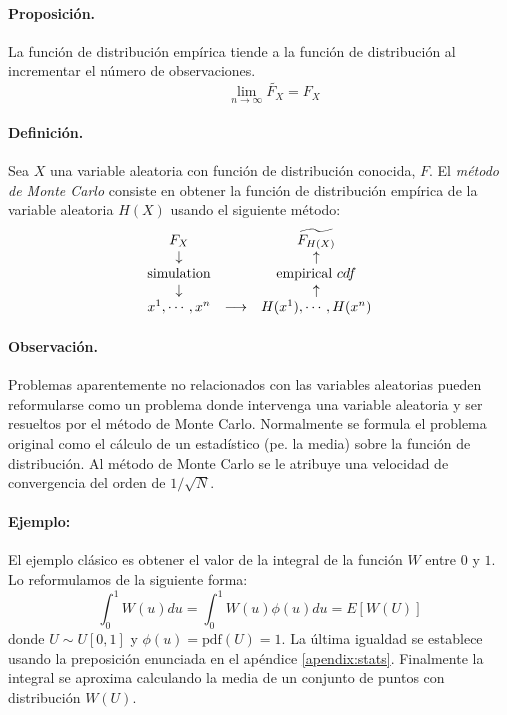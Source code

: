 \paragraph{Proposici\'on.} La funci\'on de distribuci\'on emp\'irica tiende a 
la funci\'on de distribuci\'on al incrementar el n\'umero de observaciones.
\begin{displaymath}
\qquad \lim_{n\to\infty} \widetilde{F_X} = F_X
\end{displaymath}

\paragraph{Definici\'on.} Sea $X$ una variable aleatoria con funci\'on de 
distribuci\'on conocida, $F$. El \emph{m\'etodo de Monte Carlo} consiste en obtener la funci\'on de distribuci\'on emp\'irica 
de la variable aleatoria $H(X)$ usando el siguiente m\'etodo:
\begin{displaymath}
\begin{array}{ccc}
F_X                 &     \quad       & \widetilde{F_{H(X)}}    \cr
\downarrow          &     \quad       & \uparrow                \cr
\textrm{simulation} &     \quad       & \textrm{empirical } cdf \cr
\downarrow          &     \quad       & \uparrow                \cr
x^1,\cdots,x^n      & \longrightarrow & H(x^1),\cdots,H(x^n)
\end{array}
\end{displaymath}

\paragraph{Observaci\'on.} Problemas aparentemente no relacionados con las 
variables aleatorias pueden reformularse como un problema donde intervenga
una variable aleatoria y ser resueltos por el m\'etodo de Monte Carlo. 
Normalmente se formula el problema original como el c\'alculo de un 
estad\'istico (pe. la media) sobre la funci\'on de distribuci\'on. Al
m\'etodo de Monte Carlo se le atribuye una velocidad de convergencia  
del orden de $1/\sqrt{N}$.

\paragraph{Ejemplo:} El ejemplo cl\'asico es obtener el valor de la integral 
de la funci\'on $W$ entre $0$ y $1$. Lo reformulamos de la siguiente forma:
\begin{displaymath}
\int_{0}^{1} W(u) du = \int_{0}^{1} W(u) \phi(u) du = E[W(U)]
\end{displaymath}
donde $U \sim U[0,1]$ y $\phi(u) = \textrm{pdf}(U) = 1$. La \'ultima igualdad se
establece usando la preposici\'on enunciada en el ap\'endice \ref{apendix:stats}.
Finalmente la integral se aproxima calculando la media de un conjunto de puntos
con distribuci\'on $W(U)$.

